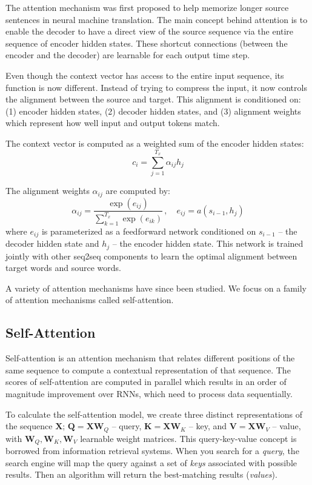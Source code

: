 The attention mechanism was first proposed \citep{bahdanau2014neural} to help memorize longer source sentences in neural machine translation. The main concept behind attention is to enable the decoder to have a direct view of the source sequence via the entire sequence of encoder hidden states. These shortcut connections (between the encoder and the decoder) are learnable for each output time step.

Even though the context vector has access to the entire input sequence, its function is now different. Instead of trying to compress the input, it now controls the alignment between the source and target. This alignment is conditioned on: (1) encoder hidden states, (2) decoder hidden states, and (3) alignment weights which represent how well input and output tokens match.

The context vector is computed as a weighted sum of the encoder hidden states:
\[ c_i = \sum_{j=1}^{T_x} \alpha_{ij} h_j \]

The alignment weights $\alpha_{ij}$ are computed by:
\[ \alpha_{ij} = \frac{\exp(e_{ij})}{\sum_{k=1}^{T_x} \exp(e_{ik})}\, , \quad e_{ij} = a(s_{i-1}, h_j) \]
where $e_{ij}$ is parameterized as a feedforward network conditioned on $s_{i-1}$ -- the decoder hidden state and $h_j$ -- the encoder hidden state. This network is trained jointly with other seq2seq components to learn the optimal alignment between target words and source words.

A variety of attention mechanisms have since been studied. We focus on a family of attention mechanisms called self-attention.


\subsection{Self-Attention}
\label{sec:self_attn}

Self-attention \citep{vaswani2017attention} is an attention mechanism that relates different positions of the same sequence to compute a contextual representation of that sequence. The scores of self-attention are computed in parallel which results in an order of magnitude improvement over RNNs, which need to process data sequentially. 

To calculate the self-attention model, we create three distinct representations of the sequence $\mathbf{X}$; $\mathbf{Q} = \mathbf{X} \mathbf{W}_Q$ -- query, $\mathbf{K} = \mathbf{X} \mathbf{W}_K$ -- key, and $\mathbf{V} = \mathbf{X} \mathbf{W}_V$ -- value, with $\mathbf{W}_Q, \mathbf{W}_K, \mathbf{W}_V$ learnable weight matrices. This query-key-value concept is borrowed from information retrieval systems. When you search for a \textit{query}, the search engine will map the query against a set of \textit{keys} associated with possible results. Then an algorithm will return the best-matching results (\textit{values}).

